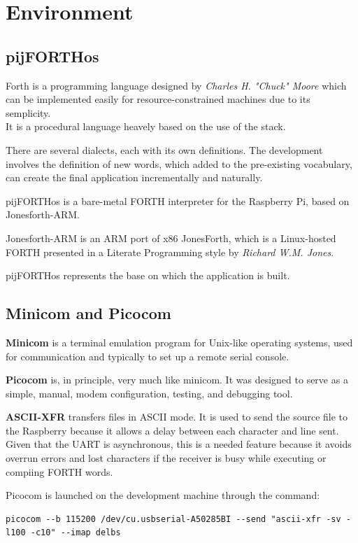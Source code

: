 \documentclass[a4paper, 12pt]{article}
\begin{document}
\section{Environment}

\subsection{pijFORTHos}
Forth is a programming language designed by \textit{Charles H. "Chuck" Moore} which can be implemented easily for resource-constrained machines due to its semplicity. \\
It is a procedural language heavely based on the use of the stack.

There are several dialects, each with its own definitions. The development involves the definition of new words, which added to the pre-existing vocabulary, can create the final application incrementally and naturally.

pijFORTHos\cite{pijFORTHos} is a bare-metal FORTH interpreter for the Raspberry Pi, based on Jonesforth-ARM\cite{JonesforthARM}. 

Jonesforth-ARM is an ARM port of x86 JonesForth, which is a Linux-hosted FORTH presented in a Literate Programming style by \textit{Richard W.M. Jones}.

pijFORTHos represents the base on which the application is built.

\subsection{Minicom and Picocom}
\textbf{Minicom}\cite{minicom} is a terminal emulation program for Unix-like operating systems, used for communication and typically to set up a remote serial console.

\textbf{Picocom}\cite{picocom} is, in principle, very much like minicom. It was designed to serve as a simple, manual, modem configuration, testing, and debugging tool.

\textbf{ASCII-XFR}\cite{ASCIIXFR} transfers files in ASCII mode. It is used to send the source file to the Raspberry because it
allows a delay between each character and line sent. \\
Given that the UART is asynchronous, this is a needed feature because it avoids overrun errors and lost characters if the receiver is busy while executing or compiing FORTH words.

Picocom is launched on the development machine through the command:
\begin{Verbatim}[breaklines=true, breakanywhere=true]
    picocom --b 115200 /dev/cu.usbserial-A50285BI --send "ascii-xfr -sv -l100 -c10" --imap delbs
\end{Verbatim}
\end{document}

